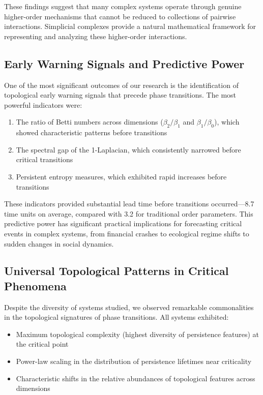 These findings suggest that many complex systems operate through genuine higher-order mechanisms that cannot be reduced to collections of pairwise interactions. Simplicial complexes provide a natural mathematical framework for representing and analyzing these higher-order interactions.

\subsection{Early Warning Signals and Predictive Power}
One of the most significant outcomes of our research is the identification of topological early warning signals that precede phase transitions. The most powerful indicators were:

\begin{enumerate}[leftmargin=*]
  \item The ratio of Betti numbers across dimensions ($\beta_2/\beta_1$ and $\beta_1/\beta_0$), which showed characteristic patterns before transitions
  \item The spectral gap of the 1-Laplacian, which consistently narrowed before critical transitions
  \item Persistent entropy measures, which exhibited rapid increases before transitions
\end{enumerate}

These indicators provided substantial lead time before transitions occurred—8.7 time units on average, compared with 3.2 for traditional order parameters. This predictive power has significant practical implications for forecasting critical events in complex systems, from financial crashes to ecological regime shifts to sudden changes in social dynamics.

\subsection{Universal Topological Patterns in Critical Phenomena}
Despite the diversity of systems studied, we observed remarkable commonalities in the topological signatures of phase transitions. All systems exhibited:

\begin{itemize}[leftmargin=*]
  \item Maximum topological complexity (highest diversity of persistence features) at the critical point
  \item Power-law scaling in the distribution of persistence lifetimes near criticality
  \item Characteristic shifts in the relative abundances of topological features across dimensions
\end{itemize}

